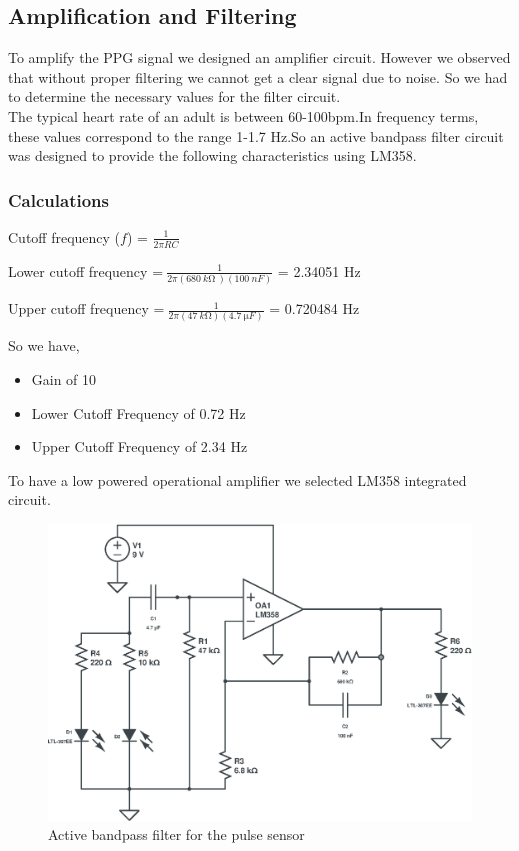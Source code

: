 \documentclass[12pt]{article}
\begin{document}
		\subsection{Amplification and Filtering}
		
		To amplify the PPG signal we designed an amplifier circuit. However we observed that without proper filtering we cannot get a clear signal due to noise.
		So we had to determine the necessary values for the filter circuit.\\
		The typical heart rate of an adult is between 60-100bpm\cite{typical_pulse}.In frequency terms, these values correspond to the range 1-1.7 Hz.So an active bandpass filter circuit was designed to provide the following characteristics using LM358.


\subsubsection{Calculations}
\begin{center}
	Cutoff frequency ($f$) = $\frac{1}{2\pi RC}$
	
	
	
	Lower cutoff frequency =$\ \frac{1}{2\pi ( 680\ k\si{\ohm}\ )( 100\ nF)}$ = 2.34051 Hz
	
	
	
	Upper cutoff frequency =$\ \frac{1}{2 \pi  ( 47\ k\si{\ohm})( 4.7\ \si{\micro}F)}$ = 0.720484 Hz
	\end{center}
	
	
	
	
	
	So we have,

		\begin{itemize}
			\item Gain of 10
			\item Lower Cutoff Frequency of 0.72 Hz
			\item Upper Cutoff Frequency of 2.34 Hz\\
		  \end{itemize}
		 To have a low powered operational amplifier we selected LM358 integrated circuit.
	
		\begin{figure}[!htbp]
			\includegraphics[width=\textwidth]{LM358-Bandpass}
			\caption{Active bandpass filter for the pulse sensor}
		\end{figure}
	
\end{document}
